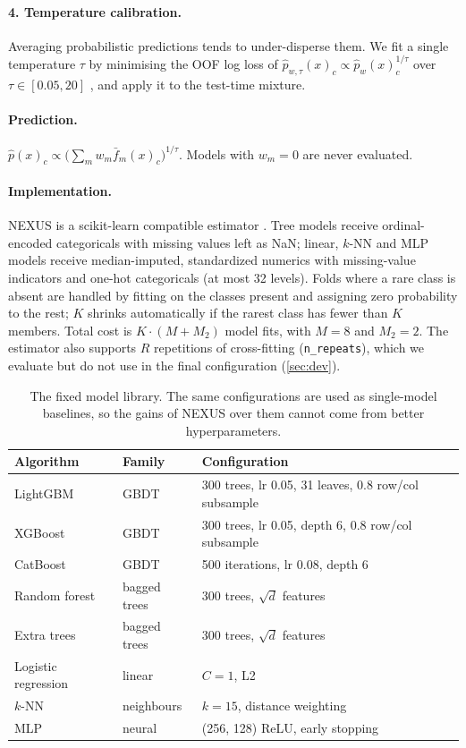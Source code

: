 \paragraph{4. Temperature calibration.}
Averaging probabilistic predictions tends to under-disperse them. We fit a
single temperature $\tau$ by minimising the OOF log loss of
$\hat p_{w,\tau}(x)_c \propto \hat p_w(x)_c^{1/\tau}$ over $\tau\in[0.05,20]$
\citep{guo2017calibration}, and apply it to the test-time mixture.

\paragraph{Prediction.}
$\hat p(x)_c \propto \big(\sum_m w_m \bar f_m(x)_c\big)^{1/\tau}$. Models with $w_m=0$ are
never evaluated.

\paragraph{Implementation.}
NEXUS is a scikit-learn compatible estimator \citep{pedregosa2011scikit}. Tree
models receive ordinal-encoded categoricals with missing values left as NaN;
linear, $k$-NN and MLP models receive median-imputed, standardized numerics with
missing-value indicators and one-hot categoricals (at most 32 levels). Folds
where a rare class is absent are handled by fitting on the classes present and
assigning zero probability to the rest; $K$ shrinks automatically if the rarest
class has fewer than $K$ members. Total cost is $K\cdot(M + M_2)$ model fits,
with $M{=}8$ and $M_2{=}2$. The estimator also supports $R$ repetitions of
cross-fitting (\texttt{n\_repeats}), which we evaluate but do not use in the
final configuration (\cref{sec:dev}).

\begin{table}[t]
\centering
\caption{The fixed model library. The same configurations are used as
single-model baselines, so the gains of NEXUS over them cannot come from
better hyperparameters.}
\label{tab:zoo}
\small
\begin{tabular}{lll}
\toprule
Algorithm & Family & Configuration \\
\midrule
LightGBM \citep{ke2017lightgbm} & GBDT & 300 trees, lr 0.05, 31 leaves, 0.8 row/col subsample \\
XGBoost \citep{chen2016xgboost} & GBDT & 300 trees, lr 0.05, depth 6, 0.8 row/col subsample \\
CatBoost \citep{prokhorenkova2018catboost} & GBDT & 500 iterations, lr 0.08, depth 6 \\
Random forest \citep{breiman2001random} & bagged trees & 300 trees, $\sqrt{d}$ features \\
Extra trees \citep{geurts2006extremely} & bagged trees & 300 trees, $\sqrt{d}$ features \\
Logistic regression & linear & $C{=}1$, L2 \\
$k$-NN & neighbours & $k{=}15$, distance weighting \\
MLP & neural & (256, 128) ReLU, early stopping \\
\bottomrule
\end{tabular}
\end{table}
